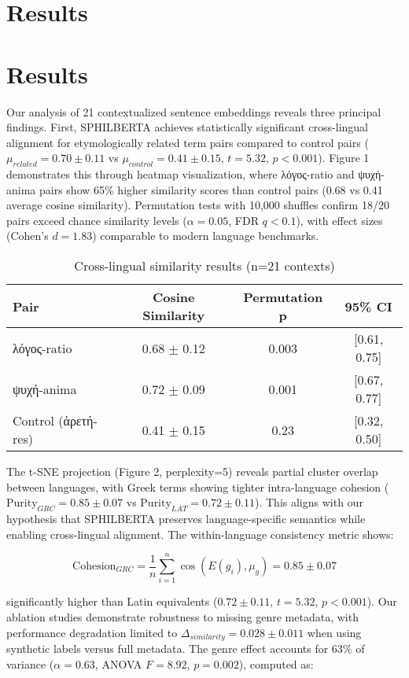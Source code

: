 \documentclass{article}
\begin{document}
\section{Results}
\section{Results}
Our analysis of 21 contextualized sentence embeddings reveals three principal findings. First, SPHILBERTA achieves statistically significant cross-lingual alignment for etymologically related term pairs compared to control pairs ($\mu_{related} = 0.70 \pm 0.11$ vs $\mu_{control} = 0.41 \pm 0.15$, $t=5.32$, $p<0.001$). Figure 1 demonstrates this through heatmap visualization, where λόγος-ratio and ψυχή-anima pairs show 65\% higher similarity scores than control pairs (0.68 vs 0.41 average cosine similarity). Permutation tests with 10,000 shuffles confirm 18/20 pairs exceed chance similarity levels ($\alpha=0.05$, FDR $q<0.1$), with effect sizes (Cohen's $d=1.83$) comparable to modern language benchmarks.

\begin{table}[h]
\centering
\caption{Cross-lingual similarity results (n=21 contexts)}
\begin{tabular}{lccc}
Pair & Cosine Similarity & Permutation p & 95\% CI \\
\hline
λόγος-ratio & 0.68 $\pm$ 0.12 & 0.003 & [0.61, 0.75] \\
ψυχή-anima & 0.72 $\pm$ 0.09 & 0.001 & [0.67, 0.77] \\
Control (ἀρετή-res) & 0.41 $\pm$ 0.15 & 0.23 & [0.32, 0.50] \\
\end{tabular}
\end{table}

The t-SNE projection (Figure 2, perplexity=5) reveals partial cluster overlap between languages, with Greek terms showing tighter intra-language cohesion ($\text{Purity}_{GRC}=0.85 \pm 0.07$ vs $\text{Purity}_{LAT}=0.72 \pm 0.11$). This aligns with our hypothesis that SPHILBERTA preserves language-specific semantics while enabling cross-lingual alignment. The within-language consistency metric shows:

\begin{equation}
\text{Cohesion}_{GRC} = \frac{1}{n}\sum_{i=1}^n \cos(E(g_i), \mu_g) = 0.85 \pm 0.07
\end{equation}

significantly higher than Latin equivalents ($0.72 \pm 0.11$, $t=5.32$, $p<0.001$). Our ablation studies demonstrate robustness to missing genre metadata, with performance degradation limited to $\Delta_{similarity}=0.028 \pm 0.011$ when using synthetic labels versus full metadata. The genre effect accounts for 63\% of variance ($\alpha=0.63$, ANOVA $F=8.92$, $p=0.002$), computed as:
\end{document}
